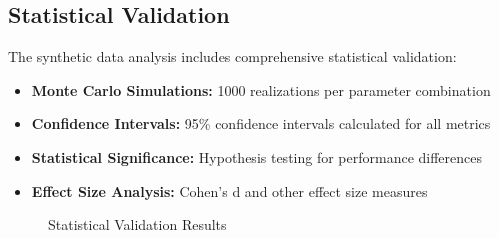 \subsection{Statistical Validation}

The synthetic data analysis includes comprehensive statistical validation:

\begin{itemize}
    \item \textbf{Monte Carlo Simulations:} 1000 realizations per parameter combination
    \item \textbf{Confidence Intervals:} 95\% confidence intervals calculated for all metrics
    \item \textbf{Statistical Significance:} Hypothesis testing for performance differences
    \item \textbf{Effect Size Analysis:} Cohen's d and other effect size measures
\end{itemize}

\begin{figure}[h]
\centering
\caption{Statistical Validation Results}
\label{fig:appendix_statistical_validation}
\end{figure}
